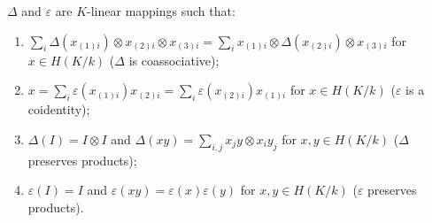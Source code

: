 $\Delta$ and $\varepsilon$ are $K$-linear mappings such that:

\begin{enumerate}
\item $\sum_i \Delta(x_{(1)i}) \otimes x_{(2)i} \otimes x_{(3)i} = \sum_i x_{(1)i} \otimes \Delta(x_{(2)i}) \otimes x_{(3)i}$ for $x \in H(K/k)$ \quad ($\Delta$ is coassociative);
\item $x = \sum_i \varepsilon(x_{(1)i}) x_{(2)i} = \sum_i \varepsilon(x_{(2)i}) x_{(1)i}$ for $x \in H(K/k)$ \quad ($\varepsilon$ is a coidentity);
\item $\Delta(I) = I \otimes I$ and $\Delta(xy) = \sum_{i,j} x_j y \otimes x_i y_j$ for $x, y \in H(K/k)$ \quad ($\Delta$ preserves products);
\item $\varepsilon(I) = I$ and $\varepsilon(xy) = \varepsilon(x)\varepsilon(y)$ for $x, y \in H(K/k)$ \quad ($\varepsilon$ preserves products).
\end{enumerate}
